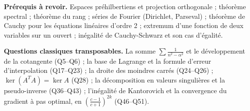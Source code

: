 \documentclass[11pt,a4paper]{article}
\begin{document}
\textbf{Prérequis à revoir.} Espaces préhilbertiens et projection orthogonale ; théorème spectral ; théorème du rang ; séries de Fourier (Dirichlet, Parseval) ; théorème de Cauchy pour les équations linéaires d'ordre 2 ; extremum d'une fonction de deux variables sur un ouvert ; inégalité de Cauchy-Schwarz et son cas d'égalité.

\textbf{Questions classiques transposables.} La somme \(\sum\frac1{n^2-\alpha^2}\) et le développement de la cotangente (Q5--Q6) ; la base de Lagrange et la formule d'erreur d'interpolation (Q17--Q23) ; la droite des moindres carrés (Q24--Q26) ; \(\ker(A^TA)=\ker A\) (Q28) ; la décomposition en valeurs singulières et la pseudo-inverse (Q36--Q43) ; l'inégalité de Kantorovich et la convergence du gradient à pas optimal, en \(\left(\frac{c-1}{c+1}\right)^{2k}\) (Q46--Q51).
\end{document}
